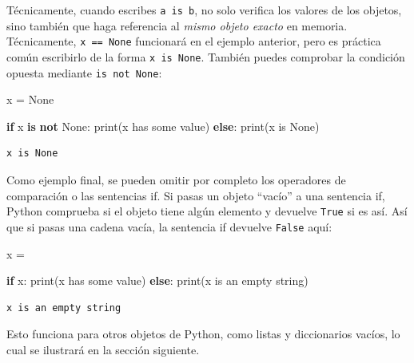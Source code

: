 \documentclass[
  letterpaper,
]{scrbook}
\newenvironment{Shaded}{\begin{snugshade}}{\end{snugshade}}
\newcommand{\BuiltInTok}[1]{\textcolor[rgb]{0.00,0.23,0.31}{#1}}
\newcommand{\ControlFlowTok}[1]{\textcolor[rgb]{0.00,0.23,0.31}{\textbf{#1}}}
\newcommand{\KeywordTok}[1]{\textcolor[rgb]{0.00,0.23,0.31}{\textbf{#1}}}
\newcommand{\NormalTok}[1]{\textcolor[rgb]{0.00,0.23,0.31}{#1}}
\newcommand{\OperatorTok}[1]{\textcolor[rgb]{0.37,0.37,0.37}{#1}}
\newcommand{\StringTok}[1]{\textcolor[rgb]{0.13,0.47,0.30}{#1}}
\newcommand{\VariableTok}[1]{\textcolor[rgb]{0.07,0.07,0.07}{#1}}
\begin{document}
Técnicamente, cuando escribes \texttt{a\ is\ b}, no solo verifica los
valores de los objetos, sino también que haga referencia al \emph{mismo
objeto exacto} en memoria. Técnicamente, \texttt{x\ ==\ None} funcionará
en el ejemplo anterior, pero es práctica común escribirlo de la forma
\texttt{x\ is\ None}. También puedes comprobar la condición opuesta
mediante \texttt{is\ not\ None}:

\begin{Shaded}
\begin{Highlighting}[]
\NormalTok{x }\OperatorTok{=} \VariableTok{None}

\ControlFlowTok{if}\NormalTok{ x }\KeywordTok{is} \KeywordTok{not} \VariableTok{None}\NormalTok{:}
  \BuiltInTok{print}\NormalTok{(}\StringTok{\textquotesingle{}x has some value\textquotesingle{}}\NormalTok{)}
\ControlFlowTok{else}\NormalTok{:}
  \BuiltInTok{print}\NormalTok{(}\StringTok{\textquotesingle{}x is None\textquotesingle{}}\NormalTok{)}
\end{Highlighting}
\end{Shaded}

\begin{verbatim}
x is None
\end{verbatim}

Como ejemplo final, se pueden omitir por completo los operadores de
comparación o las sentencias if. Si pasas un objeto ``vacío'' a una
sentencia if, Python comprueba si el objeto tiene algún elemento y
devuelve \texttt{True} si es así. Así que si pasas una cadena vacía, la
sentencia if devuelve \texttt{False} aquí:

\begin{Shaded}
\begin{Highlighting}[]
\NormalTok{x }\OperatorTok{=} \StringTok{\textquotesingle{}\textquotesingle{}}

\ControlFlowTok{if}\NormalTok{ x:}
  \BuiltInTok{print}\NormalTok{(}\StringTok{\textquotesingle{}x has some value\textquotesingle{}}\NormalTok{)}
\ControlFlowTok{else}\NormalTok{:}
  \BuiltInTok{print}\NormalTok{(}\StringTok{\textquotesingle{}x is an empty string\textquotesingle{}}\NormalTok{)}
\end{Highlighting}
\end{Shaded}

\begin{verbatim}
x is an empty string
\end{verbatim}

Esto funciona para otros objetos de Python, como listas y diccionarios
vacíos, lo cual se ilustrará en la sección siguiente.
\end{document}
